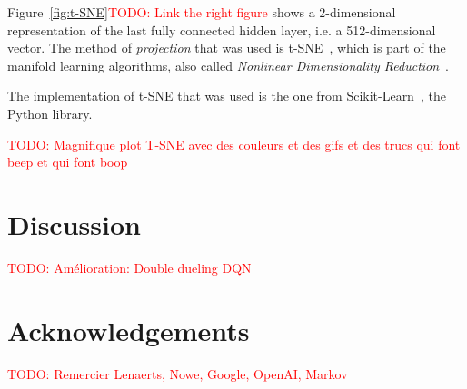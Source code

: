 \documentclass[letterpaper]{article}
\newcommand\todo[1]{\textcolor{red}{TODO: #1}}
\begin{document}
Figure~\ref{fig:t-SNE}\todo{Link the right figure} shows a 2-dimensional representation of the last fully connected hidden layer, i.e. a 512-dimensional
vector. The method of \textit{projection} that was used is t-SNE~\citep{maaten2008visualizing}, which is part of the manifold learning algorithms, also
called \textit{Nonlinear Dimensionality Reduction}~\citep{lee2007nonlinear}.

The implementation of t-SNE that was used is the one from Scikit-Learn~\citep{scikit-learn}, the Python library.

  \todo{Magnifique plot T-SNE avec des couleurs et des gifs et des trucs qui font beep et qui font boop}~\citep{wattenberg2016how}

\section{Discussion}

  \todo{Amélioration: Double dueling DQN}~\citep{DBLP:journals/corr/WangFL15}

\section{Acknowledgements}

  \todo{Remercier Lenaerts, Nowe, Google, OpenAI, Markov}

\newpage
\footnotesize


\end{document}
